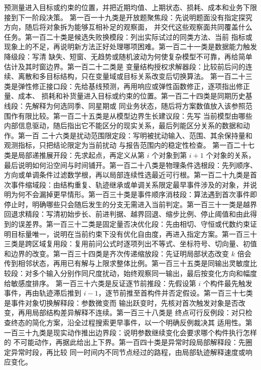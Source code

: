 \documentclass[UTF8,a4paper,12pt]{ctexart}
\begin{document}
预测量进入目标或约束的位置，并把近期均值、上期状态、损耗、成本和业务下限接到下一阶段决策。
第一百一十九类是开放题聚焦段：先说明题面没有指定探究方向，随后将对象拆为能够互相补足的观察面，
并交代这些观察面共同覆盖什么任务。第一百二十类是候选失败换模段：列出实际试过的同类方法、当前
指标或现象上的不足，再说明新方法正好处理哪项困难。第一百二十一类是数据能力触发降级段：写清
缺失、短窗、无趋势或随机波动为何使复杂模型不可靠，再给简单估计及其时窗边界。第一百二十二类是
变量结构授权求解器段：比较前后问的连续、离散和多目标结构，只在变量域或目标关系改变后切换算法。
第一百二十三类是弹性修正接口段：先给基线预测，再用响应或弹性函数修正，逐项指出修正量、成本、
损耗和补货量进入目标或约束的位置。第一百二十四类是同期历史基线段：先解释为何选同季、同星期或
同业务状态，随后将方案数值放入该参照范围作有限比较。第一百二十五类是从模型边界生长建议段：先写
当前模型由哪些内部信息驱动，随后指出它不能区分的现实关系，最后列能区分关系的数据和动作。第一百
二十六类是扰动范围限定段：写明被扰动输入、范围、其余保持量和观测指标，只把结论限定为当前扰动
与报告范围内的稳定性检查。
第一百二十七类是局部递推展开段：先求起点，再定义从第 $i$ 个对象到第 $i+1$ 个对象的关系，最后说明如何沿空间与时间铺开。第一百二十八类是物理条件选根段：先列顺序、方向或单调条件过滤数学根，再以局部连续性选最近可行根。第一百二十九类是首次事件缩域段：由结构重复、轨迹继承或单调关系限定最早事件涉及的对象，并说明为何不会漏掉更早情形。第一百三十类是事件顺序消枝段：算法遇到首次事件即停止时，明确哪些只会随后发生的分支无需进入当前判定。第一百三十一类是越界回退求精段：写清初始步长、前进判据、越界回退、缩步比例、停止阈值和由此得到的误差界。第一百三十二类是固定量否决优化段：先由相切、守恒或代数约束证明目标量唯一，说明在当前约束下没有优化自由度，再进入指定方案。第一百三十三类是跨区域复用段：复用前问公式时逐项列出不等式、坐标符号、切向量、初值和边界的改变。第一百三十四类是齐次传递缩放段：先证明局部状态改变 $k$ 倍会传到相邻状态，再用已有解与上限求整体比例。第一百三十五类是同输出灵敏度比较段：对多个输入分别作同尺度扰动，始终观察同一输出，最后按变化方向和幅度给敏感度排序。
第一百三十六类是反证逐节前推段：先假设第 $i$ 个构件最先触发事件，再由轨迹滞后推到
$i-1$，逐节前推至首构件并否定假设。第一百三十七类是事件对象切换解释段：参数微变而
输出跃变时，先核对首次触发对象是否改变，再用局部结构差异解释不连续。第一百三十八类是
终点可行反例段：对只检查终态的简化方案，沿全过程搜索更早事件，以一个明确反例裁决其
适用性。第一百三十九类是现实动作推出边界段：说明参数继续变化会要求哪个构件执行怎样的
不可能动作，再据此给出上下界。第一百四十类是异常时段局部解释段：先圈定异常时段，再比较
同一时间内不同节点经过的路程，由局部轨迹解释速度或响应变化。
\end{document}
